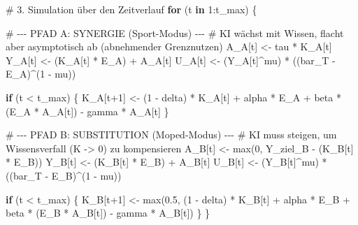 \documentclass[
  ngerman,
  letterpaper,
  DIV=11]{scrartcl}
\newenvironment{Shaded}{\begin{snugshade}}{\end{snugshade}}
\newcommand{\CommentTok}[1]{\textcolor[rgb]{0.37,0.37,0.37}{#1}}
\newcommand{\ControlFlowTok}[1]{\textcolor[rgb]{0.00,0.23,0.31}{\textbf{#1}}}
\newcommand{\DecValTok}[1]{\textcolor[rgb]{0.68,0.00,0.00}{#1}}
\newcommand{\FloatTok}[1]{\textcolor[rgb]{0.68,0.00,0.00}{#1}}
\newcommand{\FunctionTok}[1]{\textcolor[rgb]{0.28,0.35,0.67}{#1}}
\newcommand{\NormalTok}[1]{\textcolor[rgb]{0.00,0.23,0.31}{#1}}
\newcommand{\OtherTok}[1]{\textcolor[rgb]{0.00,0.23,0.31}{#1}}
\newcommand{\SpecialCharTok}[1]{\textcolor[rgb]{0.37,0.37,0.37}{#1}}
\begin{document}
\begin{Shaded}
\begin{Highlighting}[]
\CommentTok{\# 3. Simulation über den Zeitverlauf}
\ControlFlowTok{for}\NormalTok{ (t }\ControlFlowTok{in} \DecValTok{1}\SpecialCharTok{:}\NormalTok{t\_max) \{}
  
  \CommentTok{\# {-}{-}{-} PFAD A: SYNERGIE (Sport{-}Modus) {-}{-}{-}}
  \CommentTok{\# KI wächst mit Wissen, flacht aber asymptotisch ab (abnehmender Grenznutzen)}
\NormalTok{  A\_A[t] }\OtherTok{\textless{}{-}}\NormalTok{ tau }\SpecialCharTok{*}\NormalTok{ K\_A[t]}
\NormalTok{  Y\_A[t] }\OtherTok{\textless{}{-}}\NormalTok{ (K\_A[t] }\SpecialCharTok{*}\NormalTok{ E\_A) }\SpecialCharTok{+}\NormalTok{ A\_A[t]                          }
\NormalTok{  U\_A[t] }\OtherTok{\textless{}{-}}\NormalTok{ (Y\_A[t]}\SpecialCharTok{\^{}}\NormalTok{mu) }\SpecialCharTok{*}\NormalTok{ ((bar\_T }\SpecialCharTok{{-}}\NormalTok{ E\_A)}\SpecialCharTok{\^{}}\NormalTok{(}\DecValTok{1} \SpecialCharTok{{-}}\NormalTok{ mu))           }
  
  \ControlFlowTok{if}\NormalTok{ (t }\SpecialCharTok{\textless{}}\NormalTok{ t\_max) \{}
\NormalTok{    K\_A[t}\SpecialCharTok{+}\DecValTok{1}\NormalTok{] }\OtherTok{\textless{}{-}}\NormalTok{ (}\DecValTok{1} \SpecialCharTok{{-}}\NormalTok{ delta) }\SpecialCharTok{*}\NormalTok{ K\_A[t] }\SpecialCharTok{+}\NormalTok{ alpha }\SpecialCharTok{*}\NormalTok{ E\_A }\SpecialCharTok{+}\NormalTok{ beta }\SpecialCharTok{*}\NormalTok{ (E\_A }\SpecialCharTok{*}\NormalTok{ A\_A[t]) }\SpecialCharTok{{-}}\NormalTok{ gamma }\SpecialCharTok{*}\NormalTok{ A\_A[t]}
\NormalTok{  \}}
  
  \CommentTok{\# {-}{-}{-} PFAD B: SUBSTITUTION (Moped{-}Modus) {-}{-}{-}}
  \CommentTok{\# KI muss steigen, um Wissensverfall (K {-}\textgreater{} 0) zu kompensieren}
\NormalTok{  A\_B[t] }\OtherTok{\textless{}{-}} \FunctionTok{max}\NormalTok{(}\DecValTok{0}\NormalTok{, Y\_ziel\_B }\SpecialCharTok{{-}}\NormalTok{ (K\_B[t] }\SpecialCharTok{*}\NormalTok{ E\_B))}
\NormalTok{  Y\_B[t] }\OtherTok{\textless{}{-}}\NormalTok{ (K\_B[t] }\SpecialCharTok{*}\NormalTok{ E\_B) }\SpecialCharTok{+}\NormalTok{ A\_B[t]                          }
\NormalTok{  U\_B[t] }\OtherTok{\textless{}{-}}\NormalTok{ (Y\_B[t]}\SpecialCharTok{\^{}}\NormalTok{mu) }\SpecialCharTok{*}\NormalTok{ ((bar\_T }\SpecialCharTok{{-}}\NormalTok{ E\_B)}\SpecialCharTok{\^{}}\NormalTok{(}\DecValTok{1} \SpecialCharTok{{-}}\NormalTok{ mu))           }
  
  \ControlFlowTok{if}\NormalTok{ (t }\SpecialCharTok{\textless{}}\NormalTok{ t\_max) \{}
\NormalTok{    K\_B[t}\SpecialCharTok{+}\DecValTok{1}\NormalTok{] }\OtherTok{\textless{}{-}} \FunctionTok{max}\NormalTok{(}\FloatTok{0.5}\NormalTok{, (}\DecValTok{1} \SpecialCharTok{{-}}\NormalTok{ delta) }\SpecialCharTok{*}\NormalTok{ K\_B[t] }\SpecialCharTok{+}\NormalTok{ alpha }\SpecialCharTok{*}\NormalTok{ E\_B }\SpecialCharTok{+}\NormalTok{ beta }\SpecialCharTok{*}\NormalTok{ (E\_B }\SpecialCharTok{*}\NormalTok{ A\_B[t]) }\SpecialCharTok{{-}}\NormalTok{ gamma }\SpecialCharTok{*}\NormalTok{ A\_B[t])}
\NormalTok{  \}}
\NormalTok{\}}


\end{Highlighting}
\end{Shaded}
\end{document}
